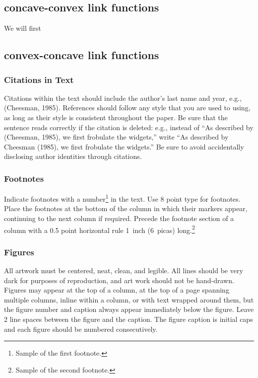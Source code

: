 \documentclass[twoside]{article} \usepackage{aistats2017}
\begin{document}
\subsection{concave-convex link functions}
We will first 
\subsection{convex-concave link functions}

\subsubsection{Citations in Text}

Citations within the text should include the author's last name and
year, e.g., (Cheesman, 1985). References should follow any style that
you are used to using, as long as their style is consistent throughout
the paper.  Be sure that the sentence reads correctly if the citation
is deleted: e.g., instead of ``As described by (Cheesman, 1985), we
first frobulate the widgets,'' write ``As described by Cheesman
(1985), we first frobulate the widgets.''  Be sure to avoid
accidentally disclosing author identities through citations.

\subsubsection{Footnotes}

Indicate footnotes with a number\footnote{Sample of the first
  footnote.} in the text. Use 8 point type for footnotes. Place the
footnotes at the bottom of the column in which their markers appear,
continuing to the next column if required. Precede the footnote
section of a column with a 0.5 point horizontal rule 1~inch (6~picas)
long.\footnote{Sample of the second footnote.}

\subsubsection{Figures}

All artwork must be centered, neat, clean, and legible.  All lines
should be very dark for purposes of reproduction, and art work should
not be hand-drawn.  Figures may appear at the top of a column, at the
top of a page spanning multiple columns, inline within a column, or
with text wrapped around them, but the figure number and caption
always appear immediately below the figure.  Leave 2 line spaces
between the figure and the caption. The figure caption is initial caps
and each figure should be numbered consecutively.
\end{document}
